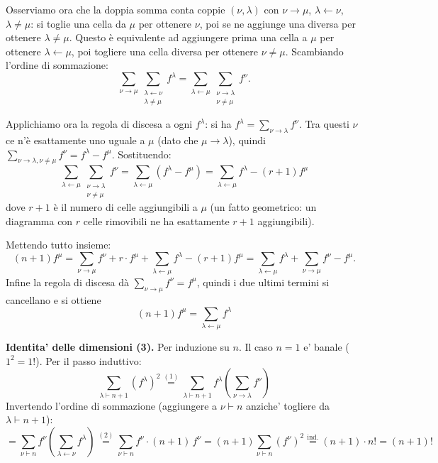 {  Osserviamo ora che la doppia somma conta coppie $(\nu, \lambda)$ con $\nu \to \mu$, $\lambda \leftarrow \nu$, $\lambda \neq \mu$: si toglie una cella da $\mu$ per ottenere $\nu$, poi se ne aggiunge una diversa per ottenere $\lambda \neq \mu$. Questo è equivalente ad aggiungere prima una cella a $\mu$ per ottenere $\lambda \leftarrow \mu$, poi togliere una cella diversa per ottenere $\nu \neq \mu$. Scambiando l'ordine di sommazione:
  \[
    \sum_{\nu \to \mu} \sum_{\substack{\lambda \leftarrow \nu \\ \lambda \neq \mu}} f^\lambda = \sum_{\lambda \leftarrow \mu} \sum_{\substack{\nu \to \lambda \\ \nu \neq \mu}} f^\nu.
  \]

  Applichiamo ora la regola di discesa a ogni $f^\lambda$: si ha $f^\lambda = \sum_{\nu \to \lambda} f^\nu$. Tra questi $\nu$ ce n'è esattamente uno uguale a $\mu$ (dato che $\mu \to \lambda$), quindi $\sum_{\nu \to \lambda, \nu \neq \mu} f^\nu = f^\lambda - f^\mu$. Sostituendo:
  \[
    \sum_{\lambda \leftarrow \mu} \sum_{\substack{\nu \to \lambda \\ \nu \neq \mu}} f^\nu = \sum_{\lambda \leftarrow \mu} (f^\lambda - f^\mu) = \sum_{\lambda \leftarrow \mu} f^\lambda - (r+1) f^\mu
  \]
  dove $r+1$ è il numero di celle aggiungibili a $\mu$ (un fatto geometrico: un diagramma con $r$ celle rimovibili ne ha esattamente $r+1$ aggiungibili).

  Mettendo tutto insieme:
  \[
    (n+1)f^\mu = \sum_{\nu \to \mu} f^\nu + r \cdot f^\mu + \sum_{\lambda \leftarrow \mu} f^\lambda - (r+1) f^\mu = \sum_{\lambda \leftarrow \mu} f^\lambda + \sum_{\nu \to \mu} f^\nu - f^\mu.
  \]
  Infine la regola di discesa dà $\sum_{\nu \to \mu} f^\nu = f^\mu$, quindi i due ultimi termini si cancellano e si ottiene
  \[
    (n+1)f^\mu = \sum_{\lambda \leftarrow \mu} f^\lambda
  \]

  \textbf{Identita' delle dimensioni (3).}
  Per induzione su $n$. Il caso $n = 1$ e' banale ($1^2 = 1!$). Per il passo induttivo:
  \[
    \sum_{\lambda \vdash n+1} (f^\lambda)^2 \overset{(1)}{=} \sum_{\lambda \vdash n+1} f^\lambda \left(\sum_{\nu \to \lambda} f^\nu\right)
  \]
  Invertendo l'ordine di sommazione (aggiungere a $\nu \vdash n$ anziche' togliere da $\lambda \vdash n+1$):
  \[
    = \sum_{\nu \vdash n} f^\nu \left(\sum_{\lambda \leftarrow \nu} f^\lambda\right) \overset{(2)}{=} \sum_{\nu \vdash n} f^\nu \cdot (n+1)\, f^\nu = (n+1) \sum_{\nu \vdash n} (f^\nu)^2 \overset{\text{ind.}}{=} (n+1) \cdot n! = (n+1)!
  \]
}

